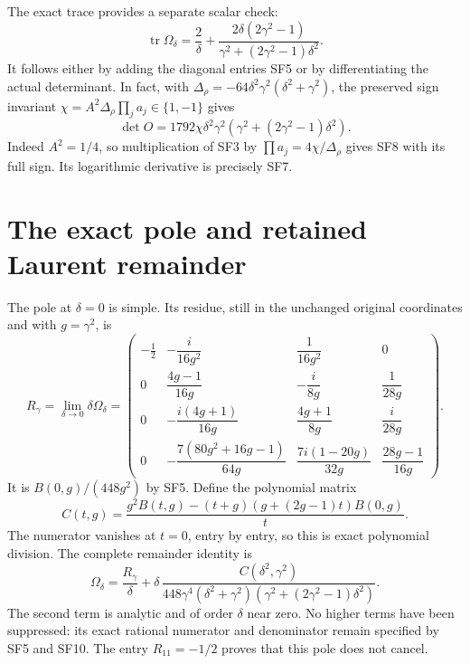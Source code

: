 \documentclass[11pt]{article}
\newcommand{\tr}{\operatorname{tr}}
\begin{document}
The exact trace provides a separate scalar check:
\begin{equation}
 \tr\Omega_\delta=\frac2\delta+
        \frac{2\delta(2\gamma^2-1)}{\gamma^2+(2\gamma^2-1)\delta^2}.
 \tag{SF7}
\end{equation}
It follows either by adding the diagonal entries SF5 or by
differentiating the actual determinant. In fact, with
$\Delta_\rho=-64\delta^2\gamma^2(\delta^2+\gamma^2)$,
the preserved sign invariant
$\chi=A^2\Delta_\rho\prod_ja_j\in\{1,-1\}$ gives
\begin{equation}
 \det O=1792\chi\delta^2\gamma^2
                    (\gamma^2+(2\gamma^2-1)\delta^2).
 \tag{SF8}
\end{equation}
Indeed $A^2=1/4$, so multiplication of SF3 by
$\prod a_j=4\chi/\Delta_\rho$ gives SF8 with its full sign.
Its logarithmic derivative is precisely SF7.

\section{The exact pole and retained Laurent remainder}
The pole at $\delta=0$ is simple. Its residue, still in the
unchanged original coordinates and with $g=\gamma^2$, is
\begin{equation}
 R_\gamma=\lim_{\delta\to0}\delta\Omega_\delta
 =\begin{pmatrix}
 -\tfrac12&-\dfrac{i}{16g^2}&\dfrac1{16g^2}&0\\[5pt]
 0&\dfrac{4g-1}{16g}&-\dfrac{i}{8g}&\dfrac1{28g}\\[5pt]
 0&-\dfrac{i(4g+1)}{16g}&\dfrac{4g+1}{8g}&\dfrac{i}{28g}\\[5pt]
 0&-\dfrac{7(80g^2+16g-1)}{64g}&\dfrac{7i(1-20g)}{32g}
                                   &\dfrac{28g-1}{16g}
 \end{pmatrix}.
 \tag{SF9}
\end{equation}
It is $B(0,g)/(448g^2)$ by SF5. Define the polynomial matrix
\[
 C(t,g)=\frac{g^2B(t,g)-(t+g)(g+(2g-1)t)B(0,g)}{t}.
\]
The numerator vanishes at $t=0$, entry by entry, so this is
exact polynomial division. The complete remainder identity is
\begin{equation}
 \Omega_\delta=\frac{R_\gamma}{\delta}
       +\delta\,\frac{C(\delta^2,\gamma^2)}
        {448\gamma^4(\delta^2+\gamma^2)
                        (\gamma^2+(2\gamma^2-1)\delta^2)}.
 \tag{SF10}
\end{equation}
The second term is analytic and of order $\delta$ near zero.
No higher terms have been suppressed: its exact rational
numerator and denominator remain specified by SF5 and SF10.
The entry $R_{11}=-1/2$ proves that this pole does not cancel.
\end{document}
